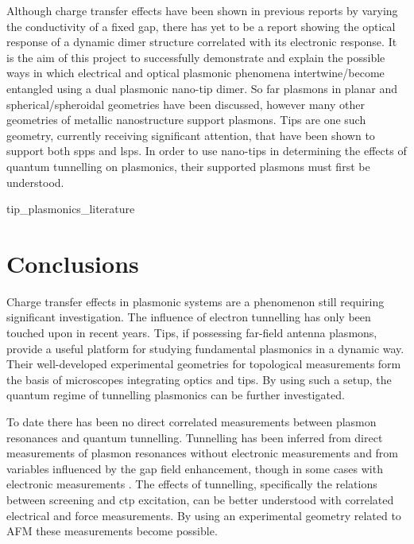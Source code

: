 \documentclass[12pt, a4paper, oneside]{book}
\begin{document}
Although charge transfer effects have been shown in previous reports by varying the conductivity of a fixed gap, there has yet to be a report showing the optical response of a dynamic dimer structure correlated with its electronic response. It is the aim of this project to successfully demonstrate and explain the possible ways in which electrical and optical plasmonic phenomena {\color{red}intertwine/become entangled} using a dual plasmonic nano-tip dimer. So far plasmons in planar and {\color{red}spherical/spheroidal} geometries have been discussed, however many other geometries of metallic nanostructure support plasmons. Tips are one such geometry, currently receiving significant attention, that have been shown to support both \glspl{spp} and \glspl{lsp}. In order to use nano-tips in determining the effects of quantum tunnelling on plasmonics, their supported plasmons must first be understood.

{tip_plasmonics_literature}

\section{Conclusions}

Charge transfer effects in plasmonic systems are a phenomenon still requiring significant investigation. The influence of electron tunnelling has only been touched upon in recent years. Tips, if possessing far-field antenna plasmons, provide a useful platform for studying fundamental plasmonics in a dynamic way. Their well-developed experimental geometries for topological measurements form the basis of microscopes integrating optics and tips. By using such a setup, the quantum regime of tunnelling plasmonics can be further investigated.

To date there has been no direct correlated measurements between plasmon resonances and quantum tunnelling. Tunnelling has been inferred from direct measurements of plasmon resonances without electronic measurements \cite{savage2012, scholl2013} and from variables influenced by the gap field enhancement, though in some cases with electronic measurements \cite{tan2014, zhu2014, hajisalem2014, cha2014}. The effects of tunnelling, specifically the relations between screening and \gls{ctp} excitation, can be better understood with correlated electrical and force measurements. By using an experimental geometry related to AFM these measurements become possible.

\ifstandalone
\begin{singlespace}
\fontsize{8pt}{1em}\selectfont
\printbibliography[notcategory=fullcited]
\end{singlespace}
\fi
\end{document}
